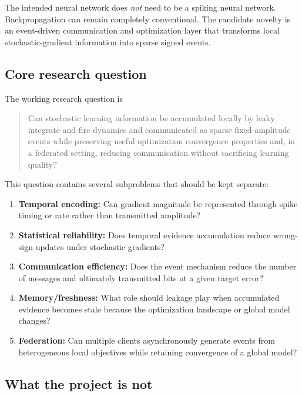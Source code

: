 The intended neural network does \emph{not} need to be a spiking neural network. Backpropagation can remain completely conventional. The candidate novelty is an event-driven communication and optimization layer that transforms local stochastic-gradient information into sparse signed events.

\subsection{Core research question}

The working research question is
\begin{quote}
Can stochastic learning information be accumulated locally by leaky integrate-and-fire dynamics and communicated as sparse fixed-amplitude events while preserving useful optimization convergence properties and, in a federated setting, reducing communication without sacrificing learning quality?
\end{quote}

This question contains several subproblems that should be kept separate:
\begin{enumerate}[label=(\roman*)]
  \item \textbf{Temporal encoding:} Can gradient magnitude be represented through spike timing or rate rather than transmitted amplitude?
  \item \textbf{Statistical reliability:} Does temporal evidence accumulation reduce wrong-sign updates under stochastic gradients?
  \item \textbf{Communication efficiency:} Does the event mechanism reduce the number of messages and ultimately transmitted bits at a given target error?
  \item \textbf{Memory/freshness:} What role should leakage play when accumulated evidence becomes stale because the optimization landscape or global model changes?
  \item \textbf{Federation:} Can multiple clients asynchronously generate events from heterogeneous local objectives while retaining convergence of a global model?
\end{enumerate}

\subsection{What the project is not}

